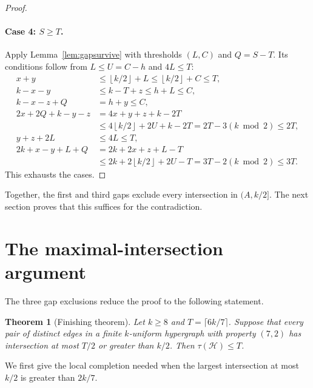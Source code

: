 \documentclass[11pt]{article}
\numberwithin{equation}{section}
\newtheorem{theorem}{Theorem}[section]
\theoremstyle{definition}
\theoremstyle{remark}
\newcommand{\HH}{\mathcal H}
\newcommand{\floor}[1]{\left\lfloor #1\right\rfloor}
\begin{document}
\begin{proof}
\paragraph{Case 4: $S\ge T$.}
Apply Lemma~\ref{lem:gapsurvive} with thresholds $(L,C)$ and
$Q=S-T$. Its conditions follow from $L\le U=C-h$ and $4L\le T$:
\begin{align*}
 x+y&\le\floor{k/2}+L\le\floor{k/2}+C\le T,\\
 k-x-y&\le k-T+z\le h+L\le C,\\
 k-x-z+Q&=h+y\le C,\\
 2x+2Q+k-y-z
 &=4x+y+z+k-2T\\
 &\le4\floor{k/2}+2U+k-2T=2T-3(k\bmod2)\le2T,\\
 y+z+2L&\le4L\le T,\\
 2k+x-y+L+Q
 &=2k+2x+z+L-T\\
 &\le2k+2\floor{k/2}+2U-T=3T-2(k\bmod2)\le3T.
\end{align*}
This exhausts the cases.
\end{proof}

Together, the first and third gaps exclude every intersection in
$(A,k/2]$. The next section proves that this suffices for the contradiction.

\section{The maximal-intersection argument}\label{sec:finish}
The three gap exclusions reduce the proof to the following statement.
\begin{theorem}[Finishing theorem]\label{thm:finish}
Let $k\ge8$ and $T=\lceil6k/7\rceil$. Suppose that every pair of
 distinct edges in a finite $k$-uniform hypergraph with property $(7,2)$
has intersection at most $T/2$ or greater than $k/2$.
Then $\tau(\HH)\le T$.
\end{theorem}
We first give the local completion needed when the largest intersection
at most $k/2$ is greater than $2k/7$.
\end{document}
